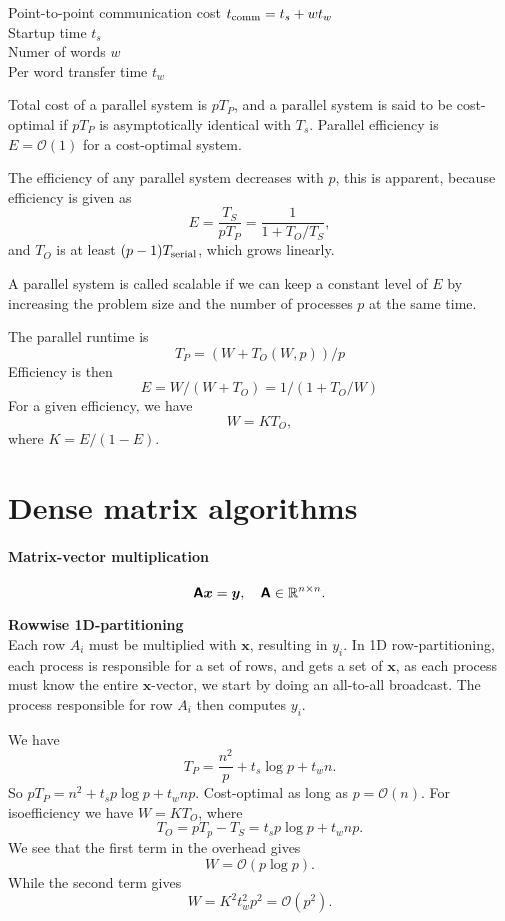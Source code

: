 \documentclass[a4paper,10pt,twoside,twocolumn]{article}
\renewcommand{\(}{\left(}
\renewcommand{\)}{\right)}
\newcommand{\bt}[1]{\boldsymbol{#1}}
\newcommand{\mat}[1]{\textsf{\textbf{#1}}}
\begin{document}
Point-to-point communication cost $t_{\rm comm} = t_s + wt_w$\\
Startup time $t_s$ \\
Numer of words $w$ \\
Per word transfer time $t_w$

Total cost of a parallel system is $pT_P$, and a parallel system is said to be cost-optimal if $pT_P$ is asymptotically identical with $T_s$. Parallel efficiency is $E=\mathcal{O}(1)$ for a cost-optimal system.

The efficiency of any parallel system decreases with $p$, this is apparent, because efficiency is given as
$$E = \frac{T_S}{pT_P} = \frac{1}{1 + T_O/T_S},$$
and $T_O$ is at least $(p-1)T_{\rm serial}$, which grows linearly.

A parallel system is called scalable if we can keep a constant level of $E$ by increasing the problem size and the number of processes $p$ at the same time.

The parallel runtime is
$$T_P = (W + T_O(W, p))/p$$
Efficiency is then
$$E = W/(W+T_O) = 1/(1+T_O/W)$$
For a given efficiency, we have
$$W = K T_O,$$
where $K=E/(1-E)$.

\clearpage

\section*{Dense matrix algorithms}

\paragraph{Matrix-vector multiplication}
$$\mat{A}\bt{x} = \bt{y}, \quad \mat{A}\in\mathbb{R}^{n\times n}.$$ 

\textbf{Rowwise 1D-partitioning} \\
Each row $A_i$ must be multiplied with $\bt{x}$, resulting in $y_i$. In 1D row-partitioning, each process is responsible for a set of rows, and gets a set of $\bt{x}$, as each process must know the entire $\bt{x}$-vector, we start by doing an all-to-all broadcast. The process responsible for row $A_i$ then computes $y_i$.

We have
$$T_P = \frac{n^2}{p} + t_s\log p + t_w n.$$
So $pT_P = n^2 + t_s p \log p + t_w n p.$
Cost-optimal as long as $p = \mathcal{O}(n)$.
For isoefficiency we have
$W = KT_O$, where 
$$T_O = pT_p - T_S = t_s p\log p + t_w n p.$$
We see that the first term in the overhead gives
$$W = \mathcal{O}(p\log p).$$
While the second term gives
$$W = K^2 t_w^2 p^2 = \mathcal{O}(p^2).$$
\end{document}
